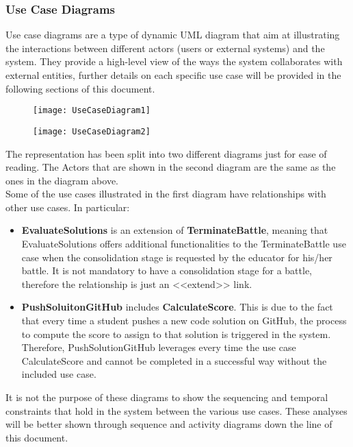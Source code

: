 
\subsubsection{Use Case Diagrams}
Use case diagrams are a type of dynamic UML diagram that aim at illustrating the interactions between different actors (users or external systems) and the  system. They provide a high-level view of the ways the system collaborates with external entities, further details on each specific use case will be provided in the following sections of this document.

\begin{figure}[H]
	\centering
	\texttt{[image: UseCaseDiagram1]}
	
	\vspace{2cm}
	
	\texttt{[image: UseCaseDiagram2]}
\end{figure}

The representation has been split into two different diagrams just for ease of reading. The Actors that are shown in the second diagram are the same as the ones in the diagram above. \\
Some of the use cases illustrated in the first diagram have relationships with other use cases. In particular:
\begin{itemize}
	\item \textbf{EvaluateSolutions} is an extension of \textbf{TerminateBattle}, meaning that EvaluateSolutions offers additional functionalities to the TerminateBattle use case when the consolidation stage is requested by the educator for his/her battle. It is not mandatory to have a consolidation stage for a battle, therefore the relationship is just an <<extend>> link.
	\item \textbf{PushSoluitonGitHub} includes \textbf{CalculateScore}. This is due to the fact that every time a student pushes a new code solution on GitHub, the process to compute the score to assign to that solution is triggered in the \app system. Therefore, PushSolutionGitHub leverages every time the use case CalculateScore and cannot be completed in a successful way without the included use case.
\end{itemize}
It is not the purpose of these diagrams to show the sequencing and temporal constraints that hold in the system between the various use cases. These analyses will be better shown through sequence and activity diagrams down the line of this document.